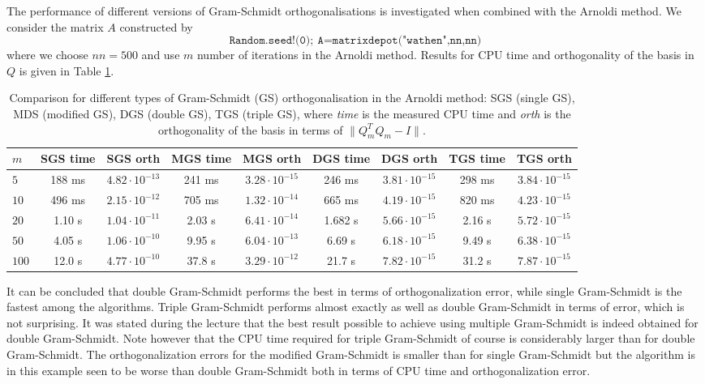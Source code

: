 The performance of different versions of Gram-Schmidt orthogonalisations is investigated when combined with the Arnoldi method. We consider the matrix $A$ constructed by
\begin{equation}
\texttt{Random.seed!(0)};\medspace\texttt{A=matrixdepot("wathen",nn,nn)}
\end{equation}
where we choose $nn=500$ and use $m$ number of iterations in the Arnoldi method.  
Results for CPU time and orthogonality of the basis in $Q$ is given in Table \ref{task3_tab}.
\begin{table}[h]
\centering
\caption{Comparison for different types of Gram-Schmidt (GS) orthogonalisation in the Arnoldi method: SGS (single GS), MDS (modified GS), DGS (double GS), TGS (triple GS), where \emph{time} is the measured CPU time and \emph{orth} is the orthogonality of the basis in terms of $\|Q_m^TQ_m-I\|$.}
\label{task3_tab}
\begin{tabular}{l || c | c|| c | c || c | c|| c | c}
$m$& SGS time & SGS orth & MGS time & MGS orth & DGS time & DGS orth & TGS time & TGS orth \\ \hline 
$5$ & 188 ms& $4.82\cdot 10^{-13}$&241 ms & $3.28\cdot 10^{-15}$ &246 ms &$3.81\cdot 10^{-15}$ &298 ms & $3.84\cdot 10^{-15}$ \\
$10$ & 496 ms& $2.15\cdot 10^{-12}$ &705 ms &$1.32\cdot 10^{-14}$ & 665 ms&$4.19\cdot 10^{-15}$ & 820 ms& $4.23\cdot 10^{-15}$ \\
$20$ & 1.10 s& $1.04\cdot 10^{-11}$&2.03 s &$6.41\cdot 10^{-14}$ &1.682 s & $5.66\cdot 10^{-15}$ & 2.16 s & $5.72\cdot 10^{-15}$\\
$50$ & 4.05 s&$1.06\cdot 10^{-10}$ &9.95 s &$6.04\cdot 10^{-13}$ &6.69 s & $6.18\cdot 10^{-15}$& 9.49 s & $6.38\cdot 10^{-15}$\\
$100$ & 12.0 s&$4.77\cdot 10^{-10}$  & 37.8 s &$3.29\cdot 10^{-12}$ & 21.7 s&$7.82\cdot 10^{-15}$ & 31.2 s& $7.87\cdot 10^{-15}$ \\
\end{tabular}
\end{table}
It can be concluded that double Gram-Schmidt performs the best in terms of orthogonalization error, while single Gram-Schmidt is the fastest among the algorithms. Triple Gram-Schmidt performs almost exactly as well as double Gram-Schmidt in terms of error, which is not surprising. It was stated during the lecture that the best result possible to achieve using multiple Gram-Schmidt is indeed obtained for double Gram-Schmidt. Note however that the CPU time required for triple Gram-Schmidt of course is considerably larger than for double Gram-Schmidt. The orthogonalization errors for the modified Gram-Schmidt is smaller than for single Gram-Schmidt but the algorithm is in this example seen to be worse than double Gram-Schmidt both in terms of CPU time and orthogonalization error. 
